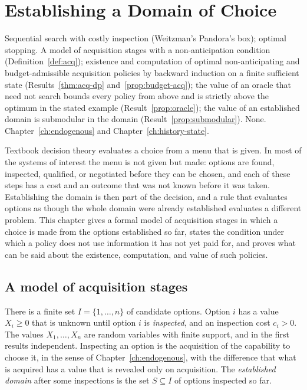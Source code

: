 \chapter{Establishing a Domain of Choice}\label{ch:domain}
{Sequential search with costly inspection (Weitzman's Pandora's box); optimal stopping.}
{A model of acquisition stages with a non-anticipation condition (Definition~\ref{def:acq}); existence and computation of optimal non-anticipating and budget-admissible acquisition policies by backward induction on a finite sufficient state (Results~\ref{thm:acq-dp} and~\ref{prop:budget-acq}); the value of an oracle that need not search bounds every policy from above and is strictly above the optimum in the stated example (Result~\ref{prop:oracle}); the value of an established domain is submodular in the domain (Result~\ref{prop:submodular}).}
{None.}
{Chapter~\ref{ch:endogenous} and Chapter~\ref{ch:history-state}.}

Textbook decision theory evaluates a choice from a menu that is given. In most of the systems of interest the menu is not given but made: options are found, inspected, qualified, or negotiated before they can be chosen, and each of these steps has a cost and an outcome that was not known before it was taken. Establishing the domain is then part of the decision, and a rule that evaluates options as though the whole domain were already established evaluates a different problem. This chapter gives a formal model of acquisition stages in which a choice is made from the options established so far, states the condition under which a policy does not use information it has not yet paid for, and proves what can be said about the existence, computation, and value of such policies.

\section{A model of acquisition stages}

There is a finite set $I=\{1,\dots,n\}$ of candidate options. Option $i$ has a value $X_i\ge0$ that is unknown until option $i$ is \emph{inspected}, and an inspection cost $c_i>0$. The values $X_1,\dots,X_n$ are random variables with finite support, and in the first results independent. Inspecting an option is the acquisition of the capability to choose it, in the sense of Chapter~\ref{ch:endogenous}, with the difference that what is acquired has a value that is revealed only on acquisition. The \emph{established domain} after some inspections is the set $S\subseteq I$ of options inspected so far.

